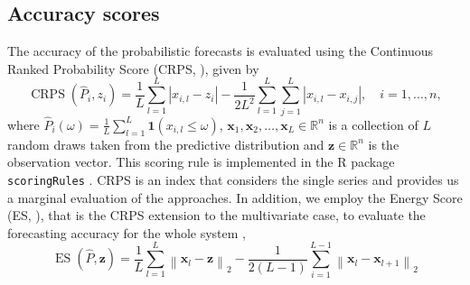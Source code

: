 \documentclass[a4paper,11pt]{article}
\newcommand{\xvet}{\bm{x}}
\newcommand{\zvet}{\bm{z}}
\theoremstyle{definition}
\begin{document}
\subsection{Accuracy scores}\label{ssec:acc_scores}

The accuracy of the probabilistic forecasts is evaluated using the Continuous Ranked Probability Score (CRPS, \citealp{gneiting2014}), given by
\begin{equation}\label{eq:crps}
	\operatorname{CRPS}(\hat{P}_i, z_i)=\frac{1}{L} \sum_{l=1}^{L}\left|x_{i,l}-z_i\right|-\frac{1}{2 L^{2}} \sum_{l=1}^{L} \sum_{j=1}^{L}\left|x_{i,l}-x_{i,j}\right|, \quad i = 1,...,n,
\end{equation}
where $\hat{P}_i(\omega)=\frac{1}{L} \sum_{l=1}^{L} \mathbf{1}\left(x_{i,l} \leq \omega\right)$, $\xvet_{1}, \xvet_{2}, \ldots, \xvet_{L}\in \mathbb{R}^{n}$ is a collection of $L$ random draws taken from the predictive distribution and $\zvet \in \mathbb{R}^{n}$ is the observation vector. This scoring rule is implemented in the \textsf{R} package \texttt{scoringRules} \citep{jordan2019}. CRPS is an index that considers the single series and provides us a marginal evaluation of the approaches.
In addition, we employ the Energy Score (ES, \citealp{gneiting2014}), that is the CRPS extension to the multivariate case, to evaluate the forecasting accuracy for the whole system \citep{wickramasuriya2021b, panagiotelis2023} ,
\begin{equation}\label{eq:es}
\operatorname{ES}(\hat{P}, \zvet)=\frac{1}{L} \sum_{l=1}^{L}\left\|\xvet_{l}-\zvet\right\|_{2}-\frac{1}{2(L-1)} \sum_{i=1}^{L-1}\left\|\xvet_{l}-\xvet_{l+1}\right\|_{2}
\end{equation}
\end{document}
